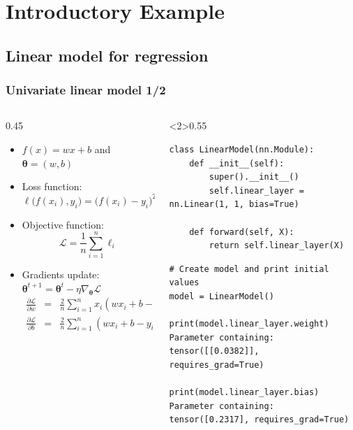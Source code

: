 \documentclass[pressentation,10pt,aspectratio=169,xcolor=table, colorlinks=true]{beamer}
\begin{document}
\section{Introductory Example}

\subsection{Linear model for regression}

\begin{frame}[fragile]
  \frametitle{Univariate linear model 1/2}
  \begin{columns}
    \begin{column}{0.45\linewidth}
      \begin{itemize}
      \item  \(f(x) = wx +b\)  and \(\boldsymbol{\theta} = (w,b)\)     
      \item Loss function: \(\ell \big(f(x_i),y_i\big) = \big(f(x_i) - y_i\big)^2\)
      \item Objective function: \[\mathcal{L} = \frac{1}{n} \sum_{i=1}^n \ell_i\]
      \item Gradients update: \(\boldsymbol{\theta}^{t+1} = \boldsymbol{\theta}^{t} - \eta\nabla_{\boldsymbol{\theta}}\mathcal{L}\)
        \begin{align*}
          \frac{\partial \mathcal{L}}{\partial w} & = & \frac{2}{n}\sum_{i=1}^n x_i(wx_i +b-y_i)\\
          \frac{\partial \mathcal{L}}{\partial b} & = & \frac{2}{n}\sum_{i=1}^n (wx_i +b-y_i)
        \end{align*}
      \end{itemize}
    \end{column}
    \begin{column}<2>{0.55\linewidth}
\begin{verbatim}
class LinearModel(nn.Module):
    def __init__(self):
        super().__init__()
        self.linear_layer = nn.Linear(1, 1, bias=True)

    def forward(self, X):
        return self.linear_layer(X)

\end{verbatim}

\begin{verbatim}
# Create model and print initial values
model = LinearModel()

print(model.linear_layer.weight)
Parameter containing:
tensor([[0.0382]], requires_grad=True)

print(model.linear_layer.bias)
Parameter containing:
tensor([0.2317], requires_grad=True)
\end{verbatim}
    \end{column}
  \end{columns}
\end{frame}
\end{document}
